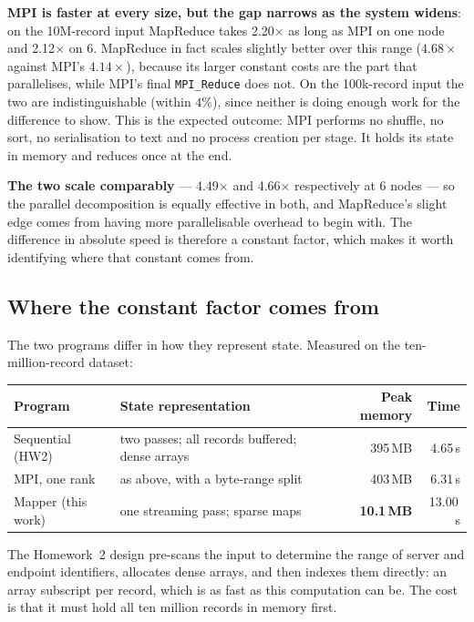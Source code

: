 \documentclass[11pt,a4paper]{article}
\begin{document}
\textbf{MPI is faster at every size, but the gap narrows as the system widens}: on the
10M-record input MapReduce takes 2.20$\times$ as long as MPI on one node and
2.12$\times$ on 6. MapReduce in fact scales slightly better over
this range ($4.68\times$ against MPI's $4.14\times$), because its larger constant costs
are the part that parallelises, while MPI's final \texttt{MPI\_Reduce} does not. On the
100k-record input the two are indistinguishable (within $4\%$), since neither is doing
enough work for the difference to show. This is the expected outcome: MPI performs
no shuffle, no sort, no serialisation to text and no process creation per stage. It
holds its state in memory and reduces once at the end.

\textbf{The two scale comparably} --- 4.49$\times$ and
4.66$\times$ respectively at 6 nodes --- so the parallel
decomposition is equally effective in both, and MapReduce's slight edge comes from
having more parallelisable overhead to begin with. The difference in absolute speed is
therefore a constant factor, which makes it worth identifying where that constant comes
from.

\subsection{Where the constant factor comes from}
The two programs differ in how they represent state. Measured on the ten-million-record
dataset:

\begin{center}\small
\begin{tabular}{@{}llrr@{}}
\toprule
\textbf{Program} & \textbf{State representation} & \textbf{Peak memory} & \textbf{Time} \\
\midrule
Sequential (HW2) & two passes; all records buffered; dense arrays & 395\,MB & 4.65\,s \\
MPI, one rank & as above, with a byte-range split & 403\,MB & 6.31\,s \\
Mapper (this work) & one streaming pass; sparse maps & \textbf{10.1\,MB} & 13.00\,s \\
\bottomrule
\end{tabular}
\end{center}

The Homework~2 design pre-scans the input to determine the range of server and endpoint
identifiers, allocates dense arrays, and then indexes them directly: an array subscript
per record, which is as fast as this computation can be. The cost is that it must hold
all ten million records in memory first.
\end{document}
